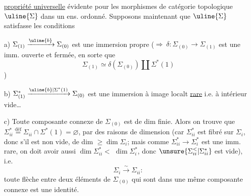 \uline{propriété universelle} évidente pour les morphismes
de  catégorie topologique $\uline{\Sigma}$ dans un ens. ordonné.
\unsure{\S} Supposons maintenant que $\uline{\Sigma}$ satisfasse les
conditions

a) $\Sigma_{(1)}\xrightarrow{\uline{b}}\Sigma_{(0)}$ est une immersion
propre ($\Longrightarrow\ \delta:\Sigma_{(0)}\longrightarrow\Sigma_{(1)}$ est une imm.
ouverte et fermée, en sorte que 
\[
\Sigma_{(1)}\simeq\delta(\Sigma_{(0)})\amalg\Sigma^{*}(1)
\]
)

b) $\Sigma^{*}_{(1)}\xrightarrow{\uline{b}|\Sigma^{*}(1)}\Sigma_{(0)}$ est une immersion à image
localt \uline{rare} i.e. à intérieur vide\ldots

c) \deleted{\unsure{---}} Toute composante connexe de $\Sigma_{(0)}$ est de
dim finie.
Alors on trouve que $\Sigma_{ii}^{*}\overset{\mathrm{déf}}{=}\Sigma_{ii}\cap\Sigma^{*}(1)=\varnothing$,
par des raisons de dimension (car $\Sigma_{ii}^{*}$ est
fibré sur  $\Sigma_i$, donc s'il est non vide, de
dim $\geq\dim\Sigma_i$; mais comme $\Sigma_{ii}^{*}\longrightarrow\Sigma_i^{*}$ est
une imm. rare, on doit avoir aussi $\dim\Sigma_{ii}^{*}<$
$\dim\Sigma_i^{*}$, donc $\unsure{\Sigma_{ii}^{<}|\Sigma_{ii}^{*}}$ est vide), i.e.
\[
\boxed{\Sigma_i\xrightarrow{\sim}\Sigma_{ii}}:
\]
toute flèche  entre deux
 éléments de $\Sigma_{(0)}$ qui sont dans une
même composante connexe  est une identité.
